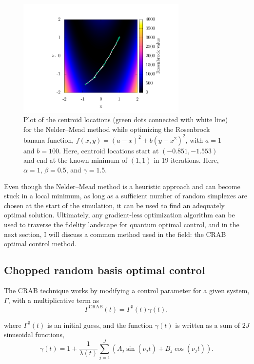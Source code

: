 \begin{figure}
\center \includegraphics[width=0.75\textwidth]{data/1d/NM/NM.pdf}
\caption{Plot of the centroid locations (green dots connected with white line) for the Nelder--Mead method while optimizing the Rosenbrock banana function, $f(x,y)=(a-x)^2+b(y-x^2)^2$, with $a=1$ and $b=100$.
Here, centroid locations start at $(-0.851,-1.553)$ and end at the known minimum of $(1,1)$ in 19 iterations.
Here, $\alpha = 1$, $\beta = 0.5$, and $\gamma = 1.5$.}
\label{fig:minimize_NM}
\end{figure}

Even though the Nelder--Mead method is a heuristic approach and can become stuck in a local minimum, as long as a sufficient number of random simplexes are chosen at the start of the simulation, it can be used to find an adequately optimal solution.
Ultimately, any gradient-less optimization algorithm can be used to traverse the fidelity landscape for quantum optimal control, and in the next section, I will discuss a common method used in the field: the CRAB optimal control method.

\subsection{Chopped random basis optimal control}
\label{sec:CRAB}

The CRAB technique works by modifying a control parameter for a given system, $\Gamma$, with a multiplicative term as
\begin{equation}
\Gamma^{\text{CRAB}}(t) = \Gamma^0(t)\gamma(t),
\end{equation}

\noindent where $\Gamma^0(t)$ is an initial guess, and the function $\gamma(t)$ is written as a sum of $2J$ sinusoidal functions,
\begin{equation}
\gamma(t)=1+\frac{1}{\lambda(t)}\sum_{j=1}^J(A_j \sin(\nu_jt) + B_j\cos(\nu_jt)).
\end{equation}

